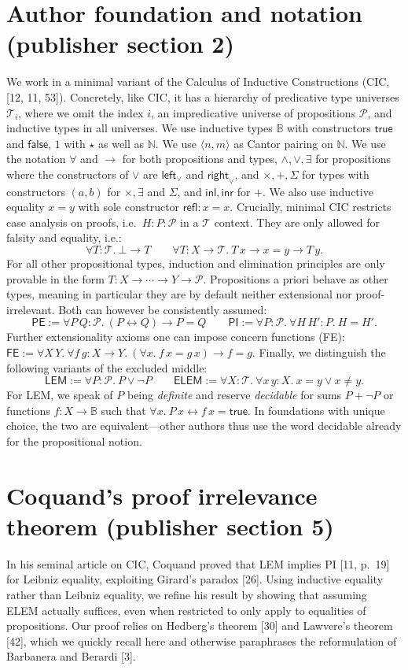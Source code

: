 \documentclass[10pt,a4paper]{amsart}
\begin{document}
\section*{Author foundation and notation (publisher section 2)}
We work in a minimal variant of the Calculus of Inductive Constructions (CIC, [12, 11, 53]).
Concretely, like CIC, it has a hierarchy of predicative type universes $\mathcal T_i$, where we omit the index $i$, an impredicative universe of propositions $\mathcal P$, and inductive types in all universes.
We use inductive types $\mathbb B$ with constructors $\mathsf{true}$ and $\mathsf{false}$, $1$ with $\star$ as well as $\mathbb N$.
We use $\langle n,m\rangle$ as Cantor pairing on $\mathbb N$.
We use the notation $\forall$ and $\to$ for both propositions and types,
$\land,\lor,\exists$ for propositions where the constructors of $\lor$ are $\mathsf{left}_{\lor}$ and $\mathsf{right}_{\lor}$, and $\times,+,\Sigma$ for types with constructors $(a,b)$ for $\times,\exists$ and $\Sigma$, and $\mathsf{inl},\mathsf{inr}$ for $+$.
We also use inductive equality $x=y$ with sole constructor $\mathsf{refl}:x=x$.
Crucially, minimal CIC restricts case analysis on proofs, i.e.\ $H:P:\mathcal P$ in a $\mathcal T$ context. They are only allowed for falsity and equality, i.e.:
\[
\forall T:\mathcal T.\ \bot\to T\qquad
\forall T:X\to\mathcal T.\ T\,x\to x=y\to T\,y.
\]
For all other propositional types, induction and elimination principles are only provable in the form $T:X\to\cdots\to Y\to\mathcal P$.
Propositions a priori behave as other types, meaning in particular they are by default neither extensional nor proof-irrelevant. Both can however be consistently assumed:
\[
\mathsf{PE}:=\forall P\,Q:\mathcal P.\ (P\leftrightarrow Q)\to P=Q
\qquad
\mathsf{PI}:=\forall P:\mathcal P.\ \forall H\,H':P.\ H=H'.
\]
Further extensionality axioms one can impose concern functions (FE): $\mathsf{FE}:=\forall X\,Y.\ \forall f\,g:X\to Y.\ (\forall x.\ f\,x=g\,x)\to f=g$.
Finally, we distinguish the following variants of the excluded middle:
\[
\mathsf{LEM}:=\forall P:\mathcal P.\ P\lor\neg P\qquad
\mathsf{ELEM}:=\forall X:\mathcal T.\ \forall x\,y:X.\ x=y\lor x\ne y.
\]
For LEM, we speak of $P$ being \emph{definite} and reserve \emph{decidable} for sums $P+\neg P$ or functions $f:X\to\mathbb B$ such that $\forall x.\ P\,x\leftrightarrow f\,x=\mathsf{true}$.
In foundations with unique choice, the two are equivalent---other authors thus use the word decidable already for the propositional notion.
\section*{Coquand's proof irrelevance theorem (publisher section 5)}
In his seminal article on CIC, Coquand proved that LEM implies PI [11, p.\ 19] for Leibniz equality, exploiting Girard's paradox [26]. Using inductive equality rather than Leibniz equality, we refine his result by showing that assuming ELEM actually suffices, even when restricted to only apply to equalities of propositions. Our proof relies on Hedberg's theorem [30] and Lawvere's theorem [42], which we quickly recall here and otherwise paraphrases the reformulation of Barbanera and Berardi [3].
\end{document}
